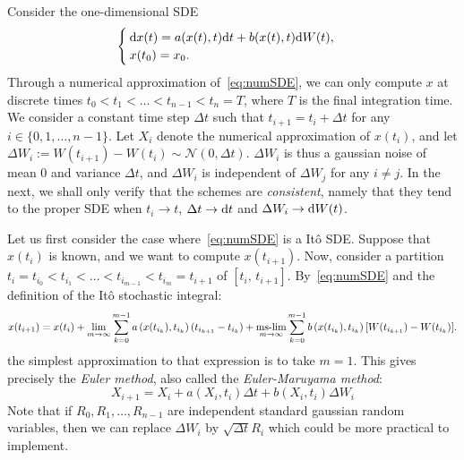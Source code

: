 Consider the one-dimensional SDE
\begin{equation} \label{eq:numSDE}
	\begin{cases}
		\rm dx(t) = a(x(t),t) \rm dt + b(x(t),t) \rm dW(t),\\
		x(t_0) = x_0. 
	\end{cases}
\end{equation}
Through a numerical approximation of~\eqref{eq:numSDE}, we can only compute $x$ at discrete times $t_0 < t_1  < \dots < t_{n-1} < t_n = T$, where $T$ is the final integration time. We consider a constant time step $\Delta t$ such that $t_{i+1} = t_i + \Delta t$ for any $i \in \{0,1,\dots,n-1\}$. Let $X_i$ denote the numerical approximation of $x(t_i)$, and let $\Delta W_i := W(t_{i+1}) - W(t_i) \sim \mathcal{N}(0,\Delta t)$. $\Delta W_i$ is thus a gaussian noise of mean $0$ and variance $\Delta t$, and $\Delta W_i$ is independent of $\Delta W_j$ for any $i \neq j$. In the next, we shall only verify that the schemes are \textit{consistent}, namely that they tend to the proper SDE when $t_i \rightarrow t$, $\Delta t \rightarrow \rm dt$ and $\Delta W_i \rightarrow \rm dW(t)$.

Let us first consider the case where~\eqref{eq:numSDE} is a Itô SDE. Suppose that $x(t_i)$ is known, and we want to compute $x(t_{i+1})$. Now, consider a partition $t_i = t_{i_0} < t_{i_1} < \dots < t_{i_{m-1}} < t_{i_m} = t_{i+1}$ of $[t_i,\, t_{i+1}]$. By~\eqref{eq:numSDE} and the definition of the Itô stochastic integral: 
\begin{equation}
	x(t_{i+1}) = x(t_{i}) + \lim_{m\rightarrow\infty} \sum_{k=0}^{m-1} a\left(x(t_{i_k}),t_{i_k}\right)(t_{i_{k+1}} - t_{i_{k}}) + \mslim_{m\rightarrow\infty} \sum_{k=0}^{m-1} b\left(x(t_{i_{k}}),t_{i_k}\right)[W(t_{i_{k+1}}) - W(t_{i_{k}})].
\end{equation}
the simplest approximation to that expression is to take $m=1$. This gives precisely the \textit{Euler method}, also called the \textit{Euler-Maruyama method}:
\begin{equation}
	X_{i+1} = X_i + a(X_i,t_i) \Delta t + b(X_i,t_i) \Delta W_i
\end{equation}
Note that if $R_0,R_1,\dots,R_{n-1}$ are independent standard gaussian random variables, then we can replace $\Delta W_i$ by $\sqrt{\Delta t}R_i$ which could be more practical to implement.


